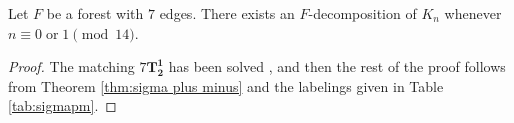 

\begin{thm}\label{thm:0 or 1 mod 14}
    Let $F$ be a forest with $7$ edges. There exists an $F$-decomposition of $K_n$ whenever $n \equiv 0 \; \textrm{or} \; 1 \pmod{14}.$
\end{thm}
\begin{proof}
    The matching $7\mathbf{T^{1}_{2}}$ has been solved \cite{deWerra1970}, and then the rest of the proof follows from Theorem \ref{thm:sigma plus minus} and the labelings given in Table \ref{tab:sigmapm}.
\end{proof}